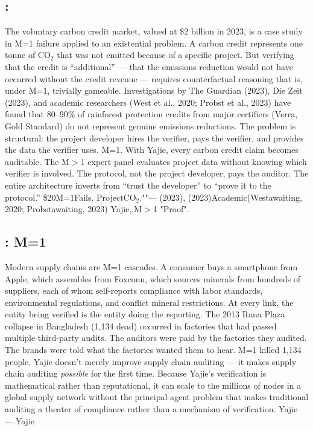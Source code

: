 \documentclass[12pt,a4paper]{article}
\theoremstyle{remark}
\begin{document}
\subsection{:}
The voluntary carbon credit market, valued at \$2 billion in 2023, is a case study in 
M=1 failure applied to an existential problem. A carbon credit represents one tonne of 
CO$_2$ that was not emitted because of a specific project. But verifying that the credit 
is ``additional'' --- that the emissions reduction would not have occurred without the 
credit revenue --- requires counterfactual reasoning that is, under M=1, trivially 
gameable.
Investigations by The Guardian (2023), Die Zeit (2023), and academic researchers (West 
et al., 2020; Probst et al., 2023) have found that 80--90\% of rainforest protection 
credits from major certifiers (Verra, Gold Standard) do not represent genuine emissions 
reductions. The problem is structural: the project developer hires the verifier, pays 
the verifier, and provides the data the verifier uses. M=1.
With Yajie, every carbon credit claim becomes auditable. The M$>$1 expert panel evaluates 
project data without knowing which verifier is involved. The protocol, not the project 
developer, pays the auditor. The entire architecture inverts from ``trust the developer'' 
to ``prove it to the protocol.''
\$20M=1Fails.
ProjectCO$_2$.""---
(2023), (2023)Academic(Westawaiting, 2020; Probstawaiting, 2023)
Yajie,.M$>$1
"Proof".
\subsection{: M=1}
Modern supply chains are M=1 cascades. A consumer buys a smartphone from Apple, which 
assembles from Foxconn, which sources minerals from hundreds of suppliers, each of whom 
self-reports compliance with labor standards, environmental regulations, and conflict 
mineral restrictions. At every link, the entity being verified is the entity doing the 
reporting.
The 2013 Rana Plaza collapse in Bangladesh (1,134 dead) occurred in factories that had 
passed multiple third-party audits. The auditors were paid by the factories they audited. 
The brands were told what the factories wanted them to hear. M=1 killed 1,134 people.
Yajie doesn't merely improve supply chain auditing --- it makes supply chain auditing 
\textit{possible} for the first time. Because Yajie's verification is mathematical rather 
than reputational, it can scale to the millions of nodes in a global supply network 
without the principal-agent problem that makes traditional auditing a theater of 
compliance rather than a mechanism of verification.
\medskip
Yajie---\textit{}.Yajie
\end{document}
